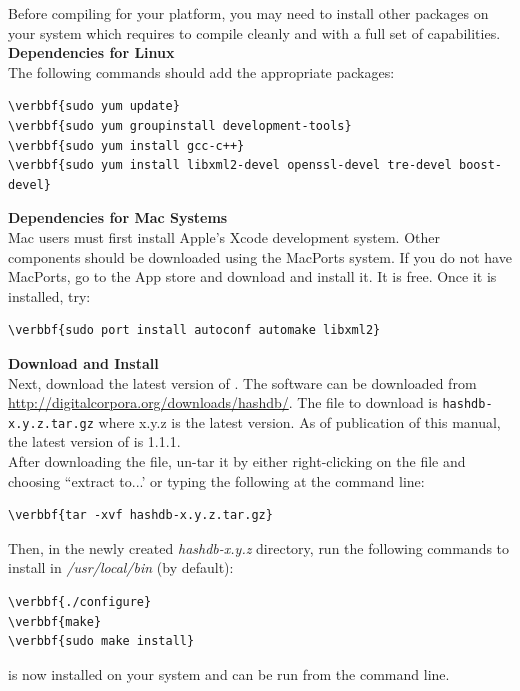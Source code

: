\documentclass[11pt,fleqn]{article} %
\begin{document}
Before compiling \hash for your platform, you may need to install other packages on your system which \hash requires to compile cleanly and with a full set of capabilities.\\

\textbf{Dependencies for Linux}\\
The following commands should add the appropriate packages:
\begin{Verbatim}[commandchars=\\\{\}]
\verbbf{sudo yum update}
\verbbf{sudo yum groupinstall development-tools}
\verbbf{sudo yum install gcc-c++}
\verbbf{sudo yum install libxml2-devel openssl-devel tre-devel boost-devel}
\end{Verbatim}

\textbf{Dependencies for Mac Systems}\\
Mac users must first install Apple's Xcode development system. Other components should be downloaded using the MacPorts system. If you do not have MacPorts, go to the App store and download and install it. It is free. Once it is installed, try:
\begin{Verbatim}[commandchars=\\\{\}]
\verbbf{sudo port install autoconf automake libxml2} 
\end{Verbatim}

\textbf{Download and Install \hash}\\
Next, download the latest version of \hash. The software can be downloaded from \url{http://digitalcorpora.org/downloads/hashdb/}. The file to download is \texttt{hashdb-x.y.z.tar.gz} where x.y.z is the latest version. As of publication of this manual, the latest version of \hash is 1.1.1.\\


After downloading the file, un-tar it by either right-clicking on the file and choosing ``extract to...' or typing the following at the command line:
\begin{Verbatim}[commandchars=\\\{\}]
\verbbf{tar -xvf hashdb-x.y.z.tar.gz}
\end{Verbatim}

Then, in the newly created \textit{hashdb-x.y.z} directory, run the following commands to install \hash in \textit{/usr/local/bin} (by default):

\begin{Verbatim}[commandchars=\\\{\}]
\verbbf{./configure}
\verbbf{make}
\verbbf{sudo make install}
\end{Verbatim}
\hash is now installed on your system and can be run from the command line. \\
\end{document}
